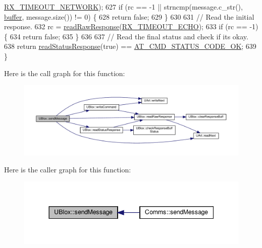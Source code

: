 \begin{DoxyCode}
      \hyperlink{_u_blox_8cpp_abebe8ab49e0adc150976b59995d9b2cd}{RX\_TIMEOUT\_NETWORK});
627     \textcolor{keywordflow}{if} (rc == -1 || strncmp(message.c\_str(), \hyperlink{class_u_blox_a6ca4b90f3dc4e856181dce1ebda6f82c}{buffer}, message.size()) != 0) \{
628         \textcolor{keywordflow}{return} \textcolor{keyword}{false};
629     \}
630 
631     \textcolor{comment}{// Read the initial response.}
632     rc = \hyperlink{class_u_blox_ab4a7ab4b8922d91e23f273ae160c1bed}{readRawResponse}(\hyperlink{_u_blox_8cpp_a55092c0742d15bb08a5ea7db5a25440e}{RX\_TIMEOUT\_ECHO});
633     \textcolor{keywordflow}{if} (rc == -1) \{
634         \textcolor{keywordflow}{return} \textcolor{keyword}{false};
635     \}
636 
637     \textcolor{comment}{// Read the final status and check if its okay.}
638     \textcolor{keywordflow}{return} \hyperlink{class_u_blox_a4eaca5b1b1c4b5b6f6164b220dd43e0b}{readStatusResponse}(\textcolor{keyword}{true}) == \hyperlink{_u_blox_8cpp_a6ebc1682eb6b9964fccb4a61688ff307}{AT\_CMD\_STATUS\_CODE\_OK};
639 \}
\end{DoxyCode}
Here is the call graph for this function\+:\nopagebreak
\begin{figure}[H]
\begin{center}
\leavevmode
\includegraphics[width=350pt]{da/df6/class_u_blox_a946f2903bb01a62cd5bdef423eaa9750_cgraph}
\end{center}
\end{figure}
Here is the caller graph for this function\+:\nopagebreak
\begin{figure}[H]
\begin{center}
\leavevmode
\includegraphics[width=344pt]{da/df6/class_u_blox_a946f2903bb01a62cd5bdef423eaa9750_icgraph}
\end{center}
\end{figure}
\mbox{\label{class_u_blox_aabed44fd41e16c9d1a8daba80f3bef06}} 
